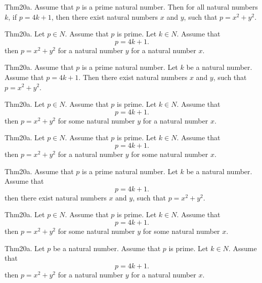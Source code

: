\documentclass{article}
\begin{document}
Thm20a. Assume that $p$ is a prime natural number. Then for all natural numbers $k$, if $p = 4 k + 1$, then there exist natural numbers $x$ and $y$, such that $p = x ^{ 2}+ y ^{ 2}$.

Thm20a. Let $p \in N$. Assume that $p$ is prime. Let $k \in N$. Assume that $$p = 4 k + 1.$$ then $p = x ^{ 2}+ y ^{ 2}$ for a natural number $y$ for a natural number $x$.

Thm20a. Assume that $p$ is a prime natural number. Let $k$ be a natural number. Assume that $p = 4 k + 1$. Then there exist natural numbers $x$ and $y$, such that $p = x ^{ 2}+ y ^{ 2}$.

Thm20a. Let $p \in N$. Assume that $p$ is prime. Let $k \in N$. Assume that $$p = 4 k + 1.$$ then $p = x ^{ 2}+ y ^{ 2}$ for some natural number $y$ for a natural number $x$.

Thm20a. Let $p \in N$. Assume that $p$ is prime. Let $k \in N$. Assume that $$p = 4 k + 1.$$ then $p = x ^{ 2}+ y ^{ 2}$ for a natural number $y$ for some natural number $x$.

Thm20a. Assume that $p$ is a prime natural number. Let $k$ be a natural number. Assume that $$p = 4 k + 1.$$ then there exist natural numbers $x$ and $y$, such that $p = x ^{ 2}+ y ^{ 2}$.

Thm20a. Let $p \in N$. Assume that $p$ is prime. Let $k \in N$. Assume that $$p = 4 k + 1.$$ then $p = x ^{ 2}+ y ^{ 2}$ for some natural number $y$ for some natural number $x$.

Thm20a. Let $p$ be a natural number. Assume that $p$ is prime. Let $k \in N$. Assume that $$p = 4 k + 1.$$ then $p = x ^{ 2}+ y ^{ 2}$ for a natural number $y$ for a natural number $x$.
\end{document}
